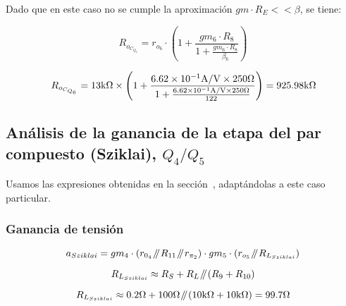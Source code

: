 Dado que en este caso no se cumple la aproximación $gm \cdot R_{E} << \beta$, se tiene:


\begin{equation}
R_{o_{C_{Q_{6}}}} = r_{o_{6}} \cdot \left( 1 + \frac{  gm_{6} \cdot R_{8}  }{  1 + \frac{ gm_{6} \cdot R_{8}  }{ \beta_{6} }   }     \right)
\end{equation}


\begin{equation*}
R_{o_{C_{Q_{6}}}} = 13 \si[per-mode=symbol]{\kilo\ohm} \times \left( 1 + \frac{  \num{6.62E-1} \si[per-mode=symbol]{\ampere\per\volt} \times 250 \si[per-mode=symbol]{\ohm}  }{  1 + \frac{  \num{6.62E-1} \si[per-mode=symbol]{\ampere\per\volt} \times 250 \si[per-mode=symbol]{\ohm}  }{ 122 }   }     \right) = 925.98 \si[per-mode=symbol]{\kilo\ohm}
\end{equation*}



\subsection{Análisis de la ganancia de la etapa del par compuesto (Sziklai), $Q_{4}/Q_{5}$}

Usamos las expresiones obtenidas en la sección~, adaptándolas a este caso particular.


\subsubsection{Ganancia de tensión}

\begin{equation}
a_{Sziklai} = gm_{4} \cdot \left( r_{0_{4}} \parallelresistors R_{11} \parallelresistors r_{\pi_{2}} \right) \cdot gm_{5} \cdot \left( r_{o_{5}} \parallelresistors R_{L_{Sziklai}} \right)
\end{equation}

\begin{equation}
R_{L_{Sziklai}} \approx R_{S} + R_{L} \parallelresistors \left( R_{9} + R_{10} \right)
\end{equation}

\begin{equation*}
R_{L_{Sziklai}} \approx 0.2 \si[per-mode=symbol]{\ohm} + 100 \si[per-mode=symbol]{\ohm} \parallelresistors \left( 10 \si[per-mode=symbol]{\kilo\ohm} + 10 \si[per-mode=symbol]{\kilo\ohm} \right) = 99.7 \si[per-mode=symbol]{\ohm}
\end{equation*}


